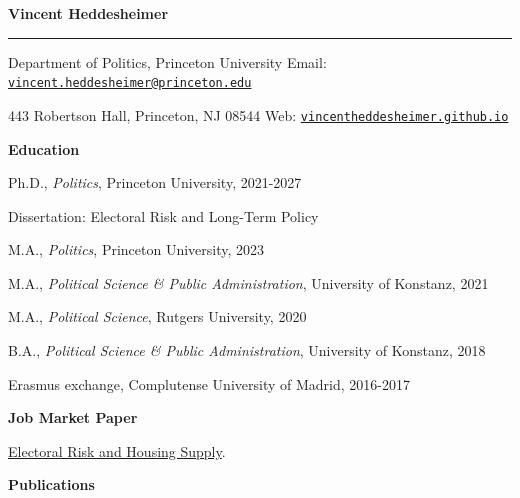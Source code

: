 \documentclass[letterpaper,10pt,oneside]{article}
\begin{document}

\noindent  \Large{\textbf{Vincent Heddesheimer}} \\
\vspace{-2ex}
\hrule
\normalsize

\vspace{4ex}

Department of Politics, Princeton University \hspace{1.5cm} {Email: \href{mailto:vincent.heddesheimer@princeton.edu}{\texttt{vincent.heddesheimer@princeton.edu}}}

443 Robertson Hall, Princeton, NJ 08544 \hspace{1.85cm}
 {Web: \href{https://vincentheddesheimer.github.io/}{\texttt{vincentheddesheimer.github.io}}}

\vspace{2ex}


{\large \textbf{Education}}

Ph.D., \textit{Politics}, Princeton University, 2021-2027

\quad Dissertation: Electoral Risk and Long-Term Policy

M.A., \textit{Politics}, Princeton University, 2023

M.A., \textit{Political Science \& Public Administration}, University of Konstanz, 2021

M.A., \textit{Political Science}, Rutgers University, 2020

B.A., \textit{Political Science \& Public Administration}, University of Konstanz, 2018

\quad Erasmus exchange, Complutense University of Madrid, 2016-2017

\vspace{2ex}

{\large \textbf{Job Market Paper}}

\quad \href{https://vincentheddesheimer.github.io/papers/Heddesheimer_JMP.pdf}{Electoral Risk and Housing Supply}.

\vspace{2ex}

{\large \textbf{Publications}}
\end{document}
